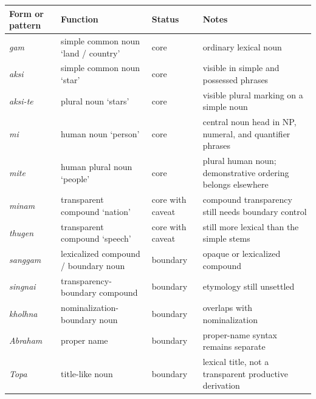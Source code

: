 \documentclass[
  11pt,
  a4paper,
]{article}
\newcounter{none} %
\newcommand{\tdim}[1]{\textit{#1}}
\newcommand{\glossquote}[1]{`#1'}
\begin{document}
{\def\LTcaptype{none} %
\begin{longtable}[]{@{}
  >{\raggedright\arraybackslash}p{}
  >{\raggedright\arraybackslash}p{}
  >{\raggedright\arraybackslash}p{}
  >{\raggedright\arraybackslash}p{}@{}}
\toprule\noalign{}
\begin{minipage}[b]{\linewidth}\raggedright
Form or pattern
\end{minipage} & \begin{minipage}[b]{\linewidth}\raggedright
Function
\end{minipage} & \begin{minipage}[b]{\linewidth}\raggedright
Status
\end{minipage} & \begin{minipage}[b]{\linewidth}\raggedright
Notes
\end{minipage} \\
\midrule\noalign{}
\endhead
\bottomrule\noalign{}
\endlastfoot
\tdim{gam} & simple common noun \glossquote{land / country} & core &
ordinary lexical noun \\
\tdim{aksi} & simple common noun \glossquote{star} & core & visible in
simple and possessed phrases \\
\tdim{aksi-te} & plural noun \glossquote{stars} & core & visible plural
marking on a simple noun \\
\tdim{mi} & human noun \glossquote{person} & core & central noun head in
NP, numeral, and quantifier phrases \\
\tdim{mite} & human plural noun \glossquote{people} & core & plural
human noun; demonstrative ordering belongs elsewhere \\
\tdim{minam} & transparent compound \glossquote{nation} & core with
caveat & compound transparency still needs boundary control \\
\tdim{thugen} & transparent compound \glossquote{speech} & core with
caveat & still more lexical than the simple stems \\
\tdim{sanggam} & lexicalized compound / boundary noun & boundary &
opaque or lexicalized compound \\
\tdim{singnai} & transparency-boundary compound & boundary & etymology
still unsettled \\
\tdim{kholhna} & nominalization-boundary noun & boundary & overlaps with
nominalization \\
\tdim{Abraham} & proper name & boundary & proper-name syntax remains
separate \\
\tdim{Topa} & title-like noun & boundary & lexical title, not a
transparent productive derivation \\
\end{longtable}
}
\end{document}
